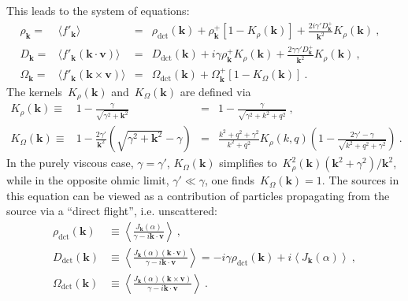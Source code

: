 \documentclass[preprint,aps,eqsecnum, prb]{revtex4-1}
\newcommand{\fplus}[1]{{#1}^{+}}
\newcommand{\dct}[1]{{#1}_\mathrm{dct}}
\begin{document}
This leads to the system of equations:
\begin{align}
  \rho_{\bm k} ={}& \langle f'_{\bm k} \rangle
     &={}&\dct{\rho}({\bm k})
  + \fplus{\rho}_{\bm k} \left[1 - K_\rho({\bm k})\right] + \frac{2 i \gamma'
    \fplus{D}_{\bm k}}{{\bm k}^2} K_\rho({\bm k})
  \ ,&
  \label{eq:wh-rho}
  \\
  D_{\bm k} ={}& \langle f'_{\bm k} ({\bm k} \cdot {\bm v}) \rangle
  &={}&\dct{D}({\bm k}) + i \gamma \fplus{\rho}_{\bm k} K_\rho({\bm k})
  + \frac{2\gamma\gamma' \fplus{D}_{\bm k}}{{\bm k}^2} K_\rho({\bm k})\ ,&
  \label{eq:wh-D}
  \\
  \Omega_{\bm k} ={}&  \langle f'_{\bm k} ({\bm k} \times {\bm v}) \rangle
  &={}&  \dct{\Omega} ({\bm k})
  + \fplus{\Omega}_{\bm k} \left[1 - K_\Omega({\bm k})\right]
  \ .&
  \label{eq:wh-Omega}
\end{align}
The kernels~$K_\rho({\bm k})$ and~$K_\Omega({\bm k})$ are defined via
\begin{align}
  \label{eq:K-rho-def}
   K_\rho({\bm k}) \equiv{}& 1 - \frac{\gamma}{\sqrt{\gamma^2 + {\bm k}^2}}
   &={}& 1 - \frac{\gamma}{\sqrt{\gamma^2 + k^2 + q^2}}\ ,
\\
\label{eq:K-omega-def}
  K_\Omega({\bm k}) \equiv{}&
  1 - \frac{2\gamma'}{{\bm k}^2}\left(\sqrt{\gamma^2 + {\bm k}^2} - \gamma\right)
  &={}& \frac{k^2 + q^2 + \gamma^2}{k^2 + q^2} K_\rho(k, q)
  \left(1 - \frac{2\gamma' - \gamma}{\sqrt{k^2 + q^2 + \gamma^2}}\right)
  \ .
\end{align}
In the purely viscous case, $\gamma = \gamma'$,
$K_\Omega({\bm k})$ simplifies
to~$K_\rho^2({\bm k}) ({\bm k}^2 + \gamma^2)/{\bm k}^2$, while
in the opposite ohmic limit, $\gamma' \ll \gamma$, one
finds~$K_\Omega({\bm k}) = 1$.
The sources in this equation can be viewed as a contribution of particles
propagating from the source via a ``direct flight'', i.e. unscattered:
\begin{align}
\label{eq:rho-direct}
  \dct{\rho}({\bm k}) &\equiv
  \left\langle
      \frac{J_{\bm k}(\alpha)}{ \gamma - i {\bm k} \cdot {\bm v}}
  \right\rangle
  \ ,
  \\
  \label{eq:D-direct}
  \dct{D}({\bm k}) &\equiv
  \left\langle
       \frac{J_{\bm k}(\alpha) ({\bm k} \cdot {\bm v})}{\gamma
                                             - i {\bm k} \cdot {\bm v}}
  \right\rangle
  = -i \gamma \dct{\rho}({\bm k})
  + i \left\langle J_{\bm k}(\alpha) \right\rangle
  \ ,
  \\
  \label{eq:omega-direct}
  \dct{\Omega}({\bm k}) &\equiv
  \left\langle
       \frac{J_{\bm k}(\alpha) ({\bm k} \times {\bm v})}{\gamma
                                            - i {\bm k} \cdot {\bm v}}
   \right\rangle
  \ .
\end{align}
\end{document}
